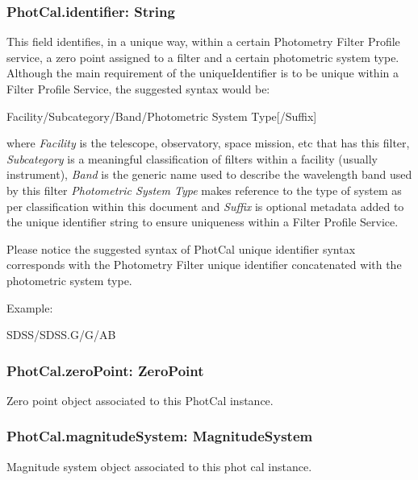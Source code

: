 \documentclass[11pt,a4paper]{ivoa}
\begin{document}
\subsubsection{PhotCal.identifier: String}
This field identifies, in a unique way, within a certain Photometry Filter Profile 
service, a zero point assigned to a filter and a certain photometric system type. 
Although the main requirement of the uniqueIdentifier is to be unique within a Filter 
Profile Service, the suggested syntax would be:
\par

Facility/Subcategory/Band/Photometric System Type[/Suffix]
\bigskip


where \textit{Facility} is the telescope, observatory, space mission, etc that 
has this filter, \textit{Subcategory} is a meaningful classification of filters 
within a facility (usually instrument), \textit{Band} is the generic name used to 
describe the wavelength band used by this filter \textit{Photometric System Type} 
makes reference to the type of system as per classification within this document 
and \textit{Suffix} is optional metadata added to the unique identifier string to 
ensure uniqueness within a Filter Profile Service.
\par

Please notice the suggested syntax of PhotCal unique identifier syntax corresponds 
with the Photometry Filter unique identifier concatenated with the photometric 
system type.
\par

Example:
\par



SDSS/SDSS.G/G/AB
\bigskip




\subsubsection{PhotCal.zeroPoint: ZeroPoint}
Zero point object associated to this PhotCal instance.
\par

\subsubsection{PhotCal.magnitudeSystem: MagnitudeSystem}
Magnitude system object associated to this phot cal instance.
\par
\end{document}
